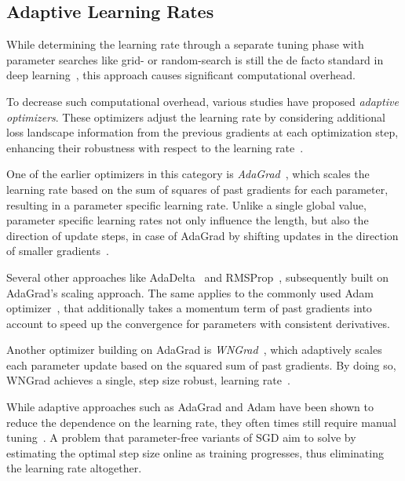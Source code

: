 \documentclass[letterpaper]{article} %
\begin{document}
\subsection{Adaptive Learning Rates}

While determining the learning rate through a separate tuning phase with parameter searches like grid- or random-search is still the de facto standard in deep learning~\cite{defazioLearningRateFreeLearningDAdaptation2023a}, this approach causes significant computational overhead.

To decrease such computational overhead, various studies have proposed \textit{adaptive optimizers}.
These optimizers adjust the learning rate by considering additional loss landscape information from the previous gradients at each optimization step, enhancing their robustness with respect to the learning rate~\cite{duchiAdaptiveSubgradientMethods2011}.

One of the earlier optimizers in this category is \textit{AdaGrad}~\cite{duchiAdaptiveSubgradientMethods2011}, which scales the learning rate based on the sum of squares of past gradients for each parameter, resulting in a parameter specific learning rate.
Unlike a single global value, parameter specific learning rates not only influence the length, but also the direction of update steps, in case of AdaGrad by shifting updates in the direction of smaller gradients~\cite{wuWNGradLearnLearning2020}. %

Several other approaches like AdaDelta~\cite{zeilerADADELTAAdaptiveLearning2012a} and RMSProp~\cite{tielemanLecture5rmspropDivide2012}, subsequently built on AdaGrad's scaling approach.
The same applies to the commonly used Adam optimizer~\cite{kingmaAdamMethodStochastic2017b}, that additionally takes a momentum term of past gradients
into account to speed up the convergence for parameters with consistent derivatives.

Another optimizer building on AdaGrad is \textit{WNGrad}~\cite{wuWNGradLearnLearning2020}, which adaptively scales each parameter update based on the squared sum of past gradients.
By doing so, WNGrad achieves a single, step size robust, learning rate~\cite{wuWNGradLearnLearning2020}.

While adaptive approaches such as AdaGrad and Adam have been shown to reduce the dependence on the learning rate, they often times still require manual tuning~\cite{wuWNGradLearnLearning2020}.
A problem that parameter-free variants of SGD aim to solve by estimating the optimal step size online as training progresses, thus eliminating the learning rate altogether.
\end{document}
